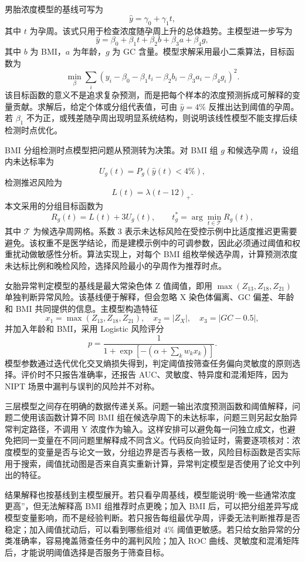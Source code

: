 \documentclass[UTF8]{ctexart}
\begin{document}
男胎浓度模型的基线可写为
\[
\hat y=\gamma_0+\gamma_1t,
\]
其中 $t$ 为孕周。该式只用于检查浓度随孕周上升的总体趋势。主模型进一步写为
\[
\hat y=\beta_0+\beta_1t+\beta_2b+\beta_3a+\beta_4g,
\]
其中 $b$ 为 BMI，$a$ 为年龄，$g$ 为 GC 含量。模型求解采用最小二乘算法，目标函数为
\[
\min_{\beta}\sum_i\left(y_i-\beta_0-\beta_1t_i-\beta_2b_i-\beta_3a_i-\beta_4g_i\right)^2.
\]
该目标函数的意义不是追求复杂预测，而是把每个样本的浓度预测拆成可解释的变量贡献。求解后，给定个体或分组代表值，可由 $\hat y=4\%$ 反推出达到阈值的孕周。若 $\beta_1$ 不为正，或残差随孕周出现明显系统结构，则说明该线性模型不能支撑后续检测时点优化。

BMI 分组检测时点模型把问题从预测转为决策。对 BMI 组 $g$ 和候选孕周 $t$，设组内未达标率为
\[
U_g(t)=P_g(\hat y(t)<4\%),
\]
检测推迟风险为
\[
L(t)=\lambda(t-12)_+.
\]
本文采用的分组目标函数为
\[
R_g(t)=L(t)+3U_g(t),
\qquad
t_g^*=\arg\min_{t\in\mathcal T}R_g(t),
\]
其中 $\mathcal T$ 为候选孕周网格。系数 3 表示未达标风险在受控示例中比适度推迟更需要避免。该权重不是医学结论，而是建模示例中的可调参数，因此必须通过阈值和权重扰动做敏感性分析。算法实现上，对每个 BMI 组枚举候选孕周，计算预测浓度未达标比例和晚检风险，选择风险最小的孕周作为推荐时点。

女胎异常判定模型的基线是最大常染色体 Z 值阈值，即用 $\max(Z_{13},Z_{18},Z_{21})$ 单独判断异常风险。该基线便于解释，但会忽略 X 染色体偏离、GC 偏差、年龄和 BMI 共同提供的信息。主模型构造特征
\[
x_1=\max(Z_{13},Z_{18},Z_{21}),\quad
x_2=|Z_X|,\quad
x_3=|GC-0.5|,
\]
并加入年龄和 BMI，采用 Logistic 风险评分
\[
p=\frac{1}{1+\exp[-(\alpha+\sum_kw_kx_k)]}.
\]
模型参数通过迭代优化交叉熵损失得到，判定阈值按筛查任务偏向灵敏度的原则选择。评价时不只报告准确率，还报告 AUC、灵敏度、特异度和混淆矩阵，因为 NIPT 场景中漏判与误判的风险并不对称。

三层模型之间存在明确的数据传递关系。问题一输出浓度预测函数和阈值解释，问题二使用该函数计算不同 BMI 组在候选孕周下的未达标率，问题三则另起女胎异常判定路径，不调用 Y 浓度作为输入。这样安排可以避免每一问独立成文，也避免把同一变量在不同问题里解释成不同含义。代码反向验证时，需要逐项核对：浓度模型的变量是否与论文一致，分组边界是否与表格一致，风险目标函数是否实际用于搜索，阈值扰动图是否来自真实重新计算，异常判定模型是否使用了论文中列出的特征。

结果解释也按基线到主模型展开。若只看孕周基线，模型能说明“晚一些通常浓度更高”，但无法解释高 BMI 组推荐时点更晚；加入 BMI 后，可以把分组差异写成模型变量影响，而不是经验判断。若只报告每组最优孕周，评委无法判断推荐是否稳定；加入阈值扰动后，可以看到哪些组对 $4\%$ 阈值更敏感。若只给女胎异常的分类准确率，容易掩盖筛查任务中的漏判风险；加入 ROC 曲线、灵敏度和混淆矩阵后，才能说明阈值选择是否服务于筛查目标。
\end{document}
